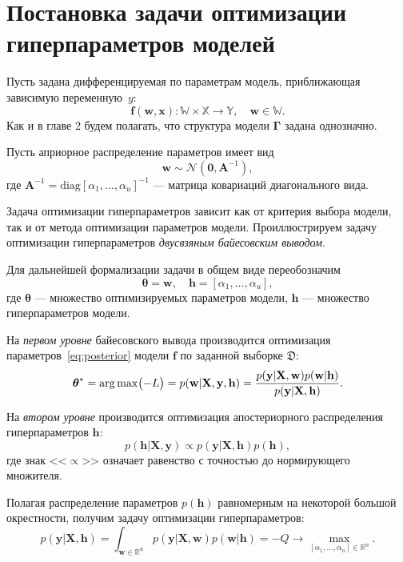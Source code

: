 \section{Постановка задачи оптимизации гиперпараметров моделей}
Пусть задана дифференцируемая по параметрам модель, приближающая зависимую переменную~$y$:
\[
	\mathbf{f}(\mathbf{w}, \mathbf{x}):\mathbb{W} \times \mathbb{X} \to \mathbb{Y}, \quad \mathbf{w} \in \mathbb{W}.
\]
Как и в главе 2 будем полагать, что структура модели $\boldsymbol{\Gamma}$ задана однозначно.

Пусть априорное распределение параметров имеет вид
\begin{equation}
\label{eq:prior}
	\mathbf{w} \sim \mathcal{N}(\mathbf{0}, \mathbf{A}^{-1}),
\end{equation}
где $\mathbf{A}^{-1} = \text{diag}[\alpha_1, \dots, \alpha_u]^{-1}$ --- матрица ковариаций диагонального вида.


Задача оптимизации гиперпараметров зависит как от критерия выбора модели, так и от метода оптимизации параметров модели.
Проиллюстрируем задачу оптимизации гиперпараметров \textit{двусвзяным байесовским выводом}.

\begin{example}
Для дальнейшей формализации задачи в общем виде переобозначим
\begin{equation}
\label{eq:bayes0}
	\boldsymbol{\theta} = \mathbf{w}, \quad \mathbf{h} = [\alpha_1, \dots, \alpha_u],	
\end{equation}
где $\boldsymbol{\theta}$ --- множество оптимизируемых параметров модели, $\mathbf{h}$ --- множество гиперпараметров модели.

На \textit{первом уровне} байесовского вывода производится оптимизация параметров~\eqref{eq:posterior} модели $\mathbf{f}$ по заданной выборке $\mathfrak{D}$:
\begin{equation}
\label{eq:bayes1}
{\boldsymbol{\theta}}^{*} = \operatorname*{arg\,max} \bigl(-L\bigr) = p(\mathbf{w}|\mathbf{X}, \mathbf{y}, \mathbf{h}) = \frac{p(\mathbf{y}|\mathbf{X},\mathbf{w})p(\mathbf{w}|\mathbf{h})}{p(\mathbf{y}|\mathbf{X},\mathbf{h})}.
\end{equation}

На \textit{втором уровне} производится оптимизация апостериорного распределения гиперпараметров $\mathbf{h}$:
\[
p(\mathbf{h}|\mathbf{X}, \mathbf{y}) \propto p(\mathbf{y}|\mathbf{X},\mathbf{h})p(\mathbf{h}),
\]
где знак <<$\propto$>> означает равенство с точностью до нормирующего множителя.

Полагая распределение параметров $p(\mathbf{h})$ равномерным на некоторой большой окрестности, получим задачу оптимизации гиперпараметров:
\begin{equation}
\label{eq:bayes2}
	p(\mathbf{y}|\mathbf{X},\mathbf{h}) = \int_{\mathbf{w} \in \mathbb{R}^u} p(\mathbf{y}|\mathbf{X}, \mathbf{w}) p(\mathbf{w}|\mathbf{h}) = -Q \to \max_{[\alpha_1, \dots, \alpha_n] \in \mathbb{R}^{n}}.
\end{equation}
\end{example}

